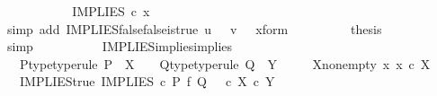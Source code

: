 \begin{isabellebody}
\ \ \ \ \ \ \isamarkupfalse%
\ \isamarkupfalse%
\ {\isachardoublequoteopen}{\isachardot}{\kern0pt}{\isachardot}{\kern0pt}{\isachardot}{\kern0pt}\ {\isacharequal}{\kern0pt}\ IMPLIES\ {\isasymcirc}\isactrlsub c\ x{\isachardoublequoteclose}\isanewline
\ \ \ \ \ \ \ \ \isamarkupfalse%
\ {\isacharparenleft}{\kern0pt}simp\ add{\isacharcolon}{\kern0pt}\ IMPLIES{\isacharunderscore}{\kern0pt}false{\isacharunderscore}{\kern0pt}false{\isacharunderscore}{\kern0pt}is{\isacharunderscore}{\kern0pt}true\ {\isacartoucheopen}u\ {\isacharequal}{\kern0pt}\ {\isasymf}{\isacartoucheclose}\ {\isacartoucheopen}v\ {\isacharequal}{\kern0pt}\ {\isasymf}{\isacartoucheclose}\ x{\isacharunderscore}{\kern0pt}form{\isacharparenright}{\kern0pt}\isanewline
\ \ \ \ \ \ \isamarkupfalse%
\ \isamarkupfalse%
\ {\isacharquery}{\kern0pt}thesis\isanewline
\ \ \ \ \ \ \ \ \isamarkupfalse%
\ simp\isanewline
\ \ \ \ \ \ \isamarkupfalse%
\isanewline
\ \ \isamarkupfalse%
\isanewline
{}\isamarkupfalse%
%
\endisatagproof
{\isafoldproof}%
%
\isadelimproof
\isanewline
%
\endisadelimproof
\isanewline
{}\isamarkupfalse%
\ IMPLIES{\isacharunderscore}{\kern0pt}implies{\isacharunderscore}{\kern0pt}implies{\isacharcolon}{\kern0pt}\isanewline
\ \ \ P{\isacharunderscore}{\kern0pt}type{\isacharbrackleft}{\kern0pt}type{\isacharunderscore}{\kern0pt}rule{\isacharbrackright}{\kern0pt}{\isacharcolon}{\kern0pt}\ {\isachardoublequoteopen}P\ {\isacharcolon}{\kern0pt}\ X\ {\isasymrightarrow}\ {\isasymOmega}{\isachardoublequoteclose}\ \ Q{\isacharunderscore}{\kern0pt}type{\isacharbrackleft}{\kern0pt}type{\isacharunderscore}{\kern0pt}rule{\isacharbrackright}{\kern0pt}{\isacharcolon}{\kern0pt}\ {\isachardoublequoteopen}Q\ {\isacharcolon}{\kern0pt}\ Y\ {\isasymrightarrow}\ {\isasymOmega}{\isachardoublequoteclose}\isanewline
\ \ \ X{\isacharunderscore}{\kern0pt}nonempty{\isacharcolon}{\kern0pt}\ {\isachardoublequoteopen}{\isasymexists}x{\isachardot}{\kern0pt}\ x\ {\isasymin}\isactrlsub c\ X{\isachardoublequoteclose}\isanewline
\ \ \ IMPLIES{\isacharunderscore}{\kern0pt}true{\isacharcolon}{\kern0pt}\ {\isachardoublequoteopen}IMPLIES\ {\isasymcirc}\isactrlsub c\ {\isacharparenleft}{\kern0pt}P\ {\isasymtimes}\isactrlsub f\ Q{\isacharparenright}{\kern0pt}\ {\isacharequal}{\kern0pt}\ {\isasymt}\ {\isasymcirc}\isactrlsub c\ {\isasymbeta}\isactrlbsub X\ {\isasymtimes}\isactrlsub c\ Y\isactrlesub {\isachardoublequoteclose}\isanewline

\end{isabellebody}
